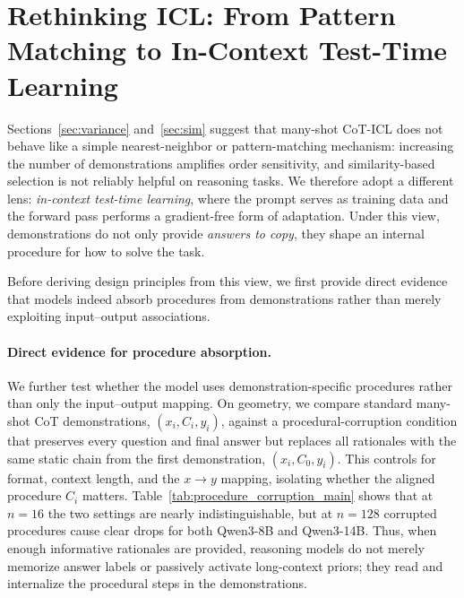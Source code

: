 
\section{Rethinking ICL: From Pattern Matching to In-Context Test-Time Learning}

Sections~\ref{sec:variance} and~\ref{sec:sim} suggest that many-shot CoT-ICL does not behave like a simple nearest-neighbor or pattern-matching mechanism: increasing the number of demonstrations amplifies order sensitivity, and similarity-based selection is not reliably helpful on reasoning tasks.
We therefore adopt a different lens: \emph{in-context test-time learning}, where the prompt serves as training data and the forward pass performs a gradient-free form of adaptation.
Under this view, demonstrations do not only provide \emph{answers to copy}, they shape an internal procedure for how to solve the task.

Before deriving design principles from this view, we first provide direct evidence that models indeed absorb procedures from demonstrations rather than merely exploiting input--output associations.

\paragraph{Direct evidence for procedure absorption.}
We further test whether the model uses demonstration-specific procedures rather than only the input--output mapping.
On geometry, we compare standard many-shot CoT demonstrations, $(x_i,C_i,y_i)$, against a procedural-corruption condition that preserves every question and final answer but replaces all rationales with the same static chain from the first demonstration, $(x_i,C_0,y_i)$.
This controls for format, context length, and the $x\rightarrow y$ mapping, isolating whether the aligned procedure $C_i$ matters.
Table~\ref{tab:procedure_corruption_main} shows that at $n=16$ the two settings are nearly indistinguishable, but at $n=128$ corrupted procedures cause clear drops for both Qwen3-8B and Qwen3-14B.
Thus, when enough informative rationales are provided, reasoning models do not merely memorize answer labels or passively activate long-context priors; they read and internalize the procedural steps in the demonstrations.

